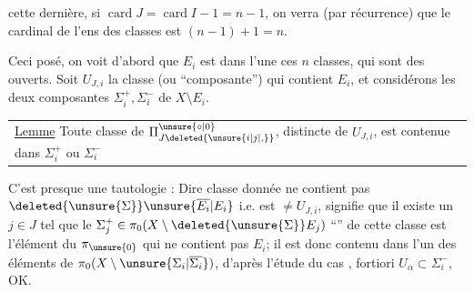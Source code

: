 cette dernière, si $\operatorname{card}J=\operatorname{card}I-1=n-1$, on verra (par récurrence) que le cardinal de l'ens des classes est $(n-1)+1=n$.

Ceci posé, on voit d'abord que $E_i$ est dans l'une   ces $n$ classes, qui sont des ouverts. Soit $U_{J,i}$ la classe (ou ``composante'') qui contient $E_i$, et considérons les deux composantes $\Sigma_i^+,\Sigma_i^-$ de $X\setminus E_i$.

\noindent\begin{tabular}{@{}|p{.91\linewidth}@{}}
\uline{Lemme} Toute classe de $\Pi_{J\deleted{\unsure{i|j|,}}}^{\unsure{\circ|0}}$, distincte de $U_{J,i}$, est contenue dans $\Sigma_i^+$ ou $\Sigma_i^-$
\end{tabular}

C'est presque une tautologie : Dire   classe donnée  ne contient pas $\deleted{\unsure{\Sigma}}\unsure{\overline{E_i}|E_i}$ i.e. est $\ne U_{J,i}$, signifie que il existe un $j\in J$ tel que le $\Sigma_j^+\in\pi_0(X\setminus \deleted{\unsure{\Sigma}}E_j)$  ``'' de cette classe  est l'élément du $\pi_{\unsure{0}}$ qui ne contient pas $E_i$; il est donc contenu dans l'un des éléments  de $\pi_0(X\setminus\unsure{\Sigma_i|\overline{\Sigma_i}})$, d'après l'étude du cas  ,   fortiori $U_\alpha\subset\Sigma_i^-$, OK.

